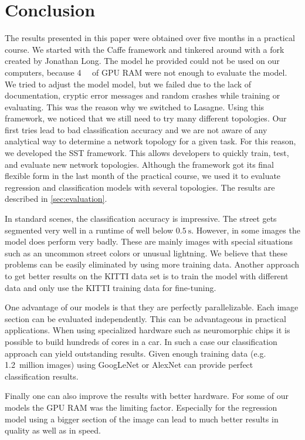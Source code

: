 
\section{Conclusion}\label{sec:discussion}

The results presented in this paper were obtained over five months in a
practical course. We started with the Caffe framework and tinkered around with
a fork created by Jonathan Long. The model he provided could not be used on our
computers, because \SI{4}{\giga\byte} of GPU RAM were not enough to evaluate
the model. We tried to adjust the model model, but we failed due to the lack of
documentation, cryptic error messages and random crashes while training or
evaluating. This was the reason why we switched to Lasagne. Using this
framework, we noticed that we still need to try many different topologies. Our
first tries lead to bad classification accuracy and we are not aware of any
analytical way to determine a network topology for a given task. For this
reason, we developed the SST framework. This allows developers to quickly
train, test, and evaluate new network topologies. Although the framework got
its final flexible form in the last month of the practical course, we used it
to evaluate regression and classification models with several topologies. The
results are described in \cref{sec:evaluation}.

In standard scenes, the classification accuracy is impressive. The street gets
segmented very well in a runtime of well below  $\SI{0.5}{\second}$. However,
in some images the model does perform very badly. These are mainly images with
special situations such as an uncommon street colors or unusual lightning. We
believe that these problems can be easily eliminated by using more training
data. Another approach to get better results on the KITTI data set is to train
the model with different data and only use the KITTI training data for
fine-tuning.

One advantage of our models is that they are perfectly parallelizable. Each
image section can be evaluated independently. This can be advantageous in
practical applications. When using specialized hardware such as neuromorphic
chips it is possible to build hundreds of cores in a car. In such a case our
classification approach can yield outstanding results. Given enough training
data (e.g. 1.2~million images) using GoogLeNet or AlexNet can provide perfect
classification results.

Finally one can also improve the results with better hardware. For some of our
models the \gls{GPU} RAM was the limiting factor. Especially for the regression
model using a bigger section of the image can lead to much better results in
quality as well as in speed.

